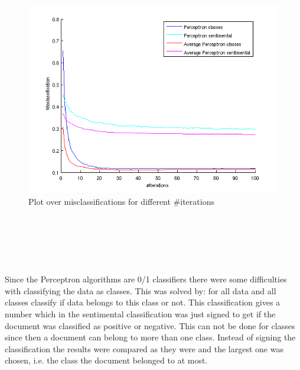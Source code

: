 \begin{figure}[h!]
\centering
\includegraphics[scale = 0.4]{../Plottar/perceptron_2000words_unigram_10foldcv_classes-high_sentimental-low.png}
\caption{Plot over misclassifications for different \#iterations}
\label{fig:number_iterations}
\end{figure}\\\\\\\\\\
Since the Perceptron algorithms are 0/1 classifiers there were some difficulties with classifying the data as classes. This was solved by: for all data and all classes classify if data belongs to this class or not. This classification gives a number which in the sentimental classification was just signed to get if the document was classified as positive or negative. This can not be done for classes since then a document can belong to more than one class. Instead of signing the classification the results were compared as they were and the largest one was chosen, i.e. the class the document belonged to at most. 
